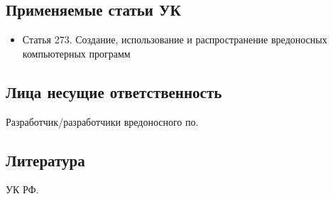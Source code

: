 \subsection*{Применяемые статьи УК}
\begin{itemize}
  \item Статья 273. Создание, использование и распространение вредоносных
    компьютерных программ
\end{itemize}

\subsection*{Лица несущие ответственность}
Разработчик/разработчики вредоносного по.

\subsection*{Литература} УК РФ.
